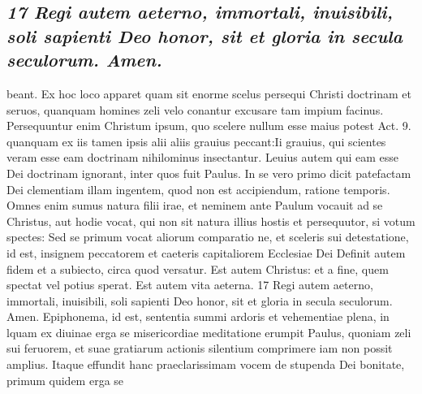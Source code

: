 \documentclass{article}
\begin{document}
\begin{pages}
\subsection*{\textit{17 Regi autem aeterno, immortali, inuisibili, soli sapienti Deo honor, sit et gloria in secula seculorum. Amen.}}beant. Ex hoc loco apparet quam sit enorme scelus persequi Christi doctrinam et seruos, quanquam homines zeli velo conantur excusare tam impium facinus. Persequuntur enim Christum ipsum, quo scelere nullum esse maius potest Act. 9. quanquam ex iis tamen ipsis alii aliis grauius peccant:Ii grauius, qui scientes veram esse eam doctrinam nihilominus insectantur. Leuius autem qui eam esse Dei doctrinam ignorant, inter quos fuit Paulus. In se vero primo dicit patefactam Dei clementiam illam ingentem, quod non est accipiendum, ratione temporis. Omnes enim sumus natura filii irae, et neminem ante Paulum vocauit ad se Christus, aut hodie vocat, qui non sit natura illius hostis et persequutor, si votum spectes: Sed se primum vocat aliorum comparatio ne, et sceleris sui detestatione, id est, insignem peccatorem et caeteris capitaliorem Ecclesiae Dei Definit autem fidem et a subiecto, circa quod versatur. Est autem Christus: et a fine, quem spectat vel potius sperat. Est autem vita aeterna. 17 Regi autem aeterno, immortali, inuisibili, soli sapienti Deo honor, sit et gloria in secula seculorum. Amen. Epiphonema, id est, sententia summi ardoris et vehementiae plena, in lquam ex diuinae erga se misericordiae meditatione erumpit Paulus, quoniam zeli sui feruorem, et suae gratiarum actionis silentium comprimere iam non possit amplius. Itaque effundit hanc praeclarissimam vocem de stupenda Dei bonitate, primum quidem erga se  \pend

\end{pages}
\end{document}
